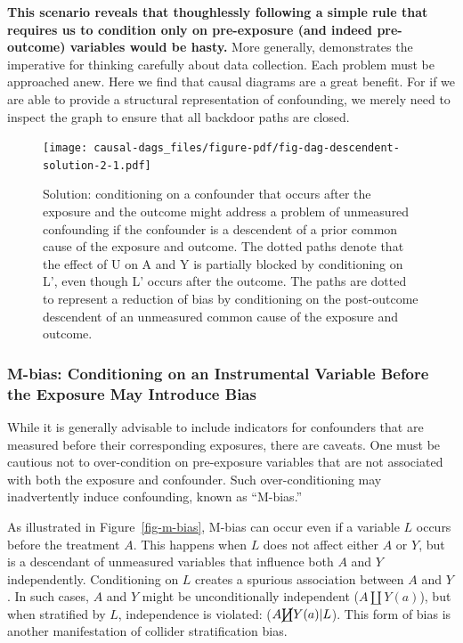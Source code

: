 \documentclass[
  singlecolumn,
  9pt]{article}
\begin{document}
\textbf{This scenario reveals that thoughlessly following a simple rule
that requires us to condition only on pre-exposure (and indeed
pre-outcome) variables would be hasty.} More generally, demonstrates the
imperative for thinking carefully about data collection. Each problem
must be approached anew. Here we find that causal diagrams are a great
benefit. For if we are able to provide a structural representation of
confounding, we merely need to inspect the graph to ensure that all
backdoor paths are closed.

\begin{figure}

{\centering \texttt{[image: causal-dags\_files/figure-pdf/fig-dag-descendent-solution-2-1.pdf]}

}

\caption{\label{fig-dag-descendent-solution-2}Solution: conditioning on
a confounder that occurs after the exposure and the outcome might
address a problem of unmeasured confounding if the confounder is a
descendent of a prior common cause of the exposure and outcome. The
dotted paths denote that the effect of U on A and Y is partially blocked
by conditioning on L', even though L' occurs after the outcome. The
paths are dotted to represent a reduction of bias by conditioning on the
post-outcome descendent of an unmeasured common cause of the exposure
and outcome.}

\end{figure}

\subsubsection{M-bias: Conditioning on an Instrumental Variable Before
the Exposure May Introduce
Bias}\label{m-bias-conditioning-on-an-instrumental-variable-before-the-exposure-may-introduce-bias}

While it is generally advisable to include indicators for confounders
that are measured before their corresponding exposures, there are
caveats. One must be cautious not to over-condition on pre-exposure
variables that are not associated with both the exposure and confounder.
Such over-conditioning may inadvertently induce confounding, known as
``M-bias.''

As illustrated in Figure~\ref{fig-m-bias}, M-bias can occur even if a
variable \(L\) occurs before the treatment \(A\). This happens when
\(L\) does not affect either \(A\) or \(Y\), but is a descendant of
unmeasured variables that influence both \(A\) and \(Y\) independently.
Conditioning on \(L\) creates a spurious association between \(A\) and
\(Y\). In such cases, \(A\) and \(Y\) might be unconditionally
independent (\(A \coprod Y(a)\)), but when stratified by \(L\),
independence is violated: (\(A \cancel{\coprod} Y(a)| L\)). This form of
bias is another manifestation of collider stratification bias.
\end{document}
